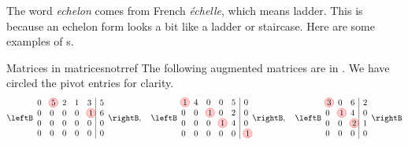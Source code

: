 The word {\em echelon} comes from French {\em \'echelle}, which means
ladder. This is because an echelon form looks a bit like a ladder or
staircase. Here are some examples of {\ef}s.


\begin{example}{Matrices in {\ef}}{matricesnotrref}
  The following augmented matrices are in {\ef}. We have circled the
  pivot entries for clarity.
  \begin{equation*}
    \leftB
    \begin{array}{rrrrr|r}
      0 & \circled{5} & 2 & 1 & 3 & 5 \\
      0 & 0 & 0 & 0 & \circled{1} & 6 \\
      0 & 0 & 0 & 0 & 0 & 0 \\
      0 & 0 & 0 & 0 & 0 & 0
    \end{array}
    \rightB, \quad \leftB
    \begin{array}{rrrrr|r}
      \circled{1} & 4 & 0 & 0 & 5 & 0 \\
      0 & 0 & \circled{1} & 0 & 2 & 0 \\
      0 & 0 & 0 & \circled{1} & 4 & 0 \\
      0 & 0 & 0 & 0 & 0 & \circled{1}
    \end{array}
    \rightB, \quad \leftB
    \begin{array}{rrr|r}
      \circled{3} & 0 & 6 & 2 \\
      0 & \circled{1} & 4 & 0 \\
      0 & 0 & \circled{2} & 1 \\
      0 &  0 & 0 & 0
    \end{array}
    \rightB
  \end{equation*}
\end{example}

